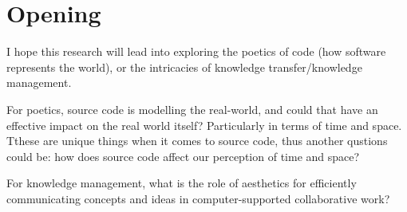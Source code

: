 
\section{Opening} %

I hope this research will lead into exploring the poetics of code (how software represents the world), or the intricacies of knowledge transfer/knowledge management.

For poetics, source code is modelling the real-world, and could that have an effective impact on the real world itself? Particularly in terms of  time and space. Tthese are unique things when it comes to source code, thus another qustions could be: how does source code affect our perception of time and space?

For knowledge management, what is the role of aesthetics for efficiently communicating concepts and ideas in computer-supported collaborative work?